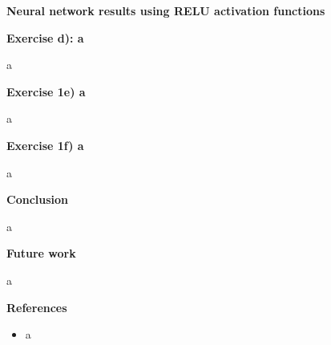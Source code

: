 \documentclass[12pt,a4paper]{article}
\begin{document}
\begin{center}
\large{\textbf{Neural network results using RELU activation functions}}
\end{center}

\newpage

\begin{center}
\Large{\textbf{Exercise d): a}}
\end{center}

\noindent a

\newpage

\begin{center}
\Large{\textbf{Exercise 1e) a}}
\end{center}

\noindent a

\newpage

\begin{center}
\Large{\textbf{Exercise 1f) a}}
\end{center}

\noindent a

\newpage

\begin{center}
\Large{\textbf{Conclusion}}
\end{center}

\noindent a

\newpage

\begin{center}
\Large{\textbf{Future work}}
\end{center}

\noindent a

\newpage

\begin{center}
\Large{\textbf{References}}
\end{center}

\begin{itemize}
  \item a
\end{itemize}
\end{document}
